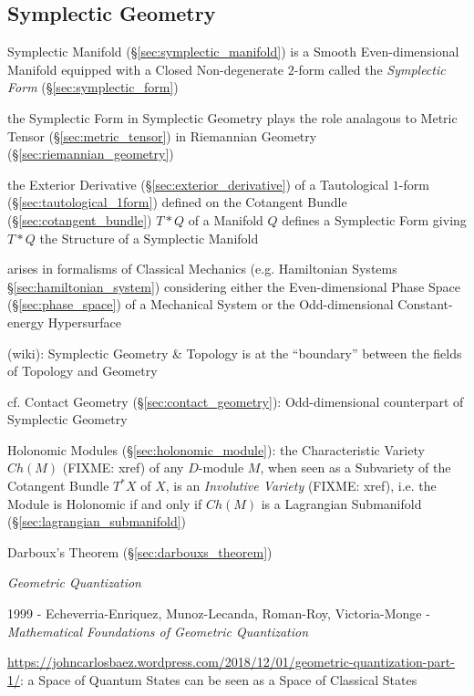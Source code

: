 \subsection{Symplectic Geometry}\label{sec:symplectic_geometry}

Symplectic Manifold (\S\ref{sec:symplectic_manifold}) is a Smooth
Even-dimensional Manifold equipped with a Closed Non-degenerate $2$-form called
the \emph{Symplectic Form} (\S\ref{sec:symplectic_form})

the Symplectic Form in Symplectic Geometry plays the role analagous to Metric
Tensor (\S\ref{sec:metric_tensor}) in Riemannian Geometry
(\S\ref{sec:riemannian_geometry})

the Exterior Derivative (\S\ref{sec:exterior_derivative}) of a Tautological
$1$-form (\S\ref{sec:tautological_1form}) defined on the Cotangent Bundle
(\S\ref{sec:cotangent_bundle}) $T * Q$ of a Manifold $Q$ defines a Symplectic
Form giving $T * Q$ the Structure of a Symplectic Manifold

arises in formalisms of Classical Mechanics (e.g. Hamiltonian Systems
\S\ref{sec:hamiltonian_system}) considering either the Even-dimensional Phase
Space (\S\ref{sec:phase_space}) of a Mechanical System or the Odd-dimensional
Constant-energy Hypersurface

(wiki): Symplectic Geometry \& Topology is at the ``boundary'' between the
fields of Topology and Geometry

\fist cf. Contact Geometry (\S\ref{sec:contact_geometry}): Odd-dimensional
counterpart of Symplectic Geometry

\fist Holonomic Modules (\S\ref{sec:holonomic_module}): the Characteristic
Variety $Ch(M)$ (FIXME: xref) of any $D$-module $M$, when seen as a Subvariety
of the Cotangent Bundle $T^*X$ of $X$, is an \emph{Involutive Variety} (FIXME:
xref), i.e. the Module is Holonomic if and only if $Ch(M)$ is a Lagrangian
Submanifold (\S\ref{sec:lagrangian_submanifold})

Darboux's Theorem (\S\ref{sec:darbouxs_theorem})

\emph{Geometric Quantization}

1999 - Echeverria-Enriquez, Munoz-Lecanda, Roman-Roy, Victoria-Monge -
\emph{Mathematical Foundations of Geometric Quantization}

\url{https://johncarlosbaez.wordpress.com/2018/12/01/geometric-quantization-part-1/}:
a Space of Quantum States can be seen as a Space of Classical States

